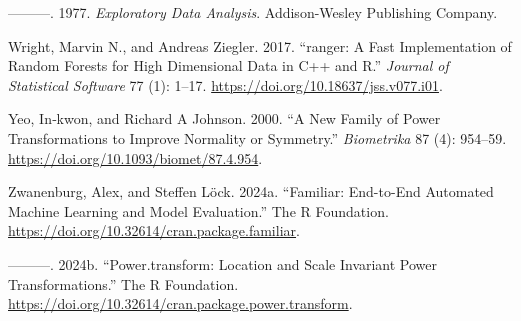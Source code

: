 \documentclass[
  a4paper,
]{article}
\newlength{\cslhangindent}
\newenvironment{CSLReferences}[2] %
 {\begin{list}{}{%
  \setlength{\itemindent}{0pt}
  \setlength{\leftmargin}{0pt}
  \setlength{\parsep}{0pt}
  \ifodd #1
   \setlength{\leftmargin}{\cslhangindent}
   \setlength{\itemindent}{-1\cslhangindent}
  \fi
  \setlength{\itemsep}{#2\baselineskip}}}
 {\end{list}}
\begin{document}
\begin{CSLReferences}{1}{0}
---------. 1977. \emph{Exploratory Data Analysis}. Addison-Wesley
Publishing Company.

Wright, Marvin N., and Andreas Ziegler. 2017. {``{ranger}: A Fast
Implementation of Random Forests for High Dimensional Data in {C++} and
{R}.''} \emph{Journal of Statistical Software} 77 (1): 1--17.
\url{https://doi.org/10.18637/jss.v077.i01}.

Yeo, In‐kwon, and Richard A Johnson. 2000. {``A New Family of Power
Transformations to Improve Normality or Symmetry.''} \emph{Biometrika}
87 (4): 954--59. \url{https://doi.org/10.1093/biomet/87.4.954}.

Zwanenburg, Alex, and Steffen Löck. 2024a. {``Familiar: End-to-End
Automated Machine Learning and Model Evaluation.''} The R Foundation.
\url{https://doi.org/10.32614/cran.package.familiar}.

---------. 2024b. {``Power.transform: Location and Scale Invariant Power
Transformations.''} The R Foundation.
\url{https://doi.org/10.32614/cran.package.power.transform}.

\end{CSLReferences}
\end{document}
